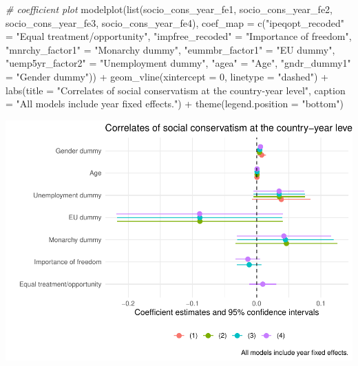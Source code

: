 \documentclass[
]{article}
\newenvironment{Shaded}{\begin{snugshade}}{\end{snugshade}}
\newcommand{\AttributeTok}[1]{\textcolor[rgb]{0.77,0.63,0.00}{#1}}
\newcommand{\CommentTok}[1]{\textcolor[rgb]{0.56,0.35,0.01}{\textit{#1}}}
\newcommand{\DecValTok}[1]{\textcolor[rgb]{0.00,0.00,0.81}{#1}}
\newcommand{\FunctionTok}[1]{\textcolor[rgb]{0.00,0.00,0.00}{#1}}
\newcommand{\NormalTok}[1]{#1}
\newcommand{\OtherTok}[1]{\textcolor[rgb]{0.56,0.35,0.01}{#1}}
\newcommand{\SpecialCharTok}[1]{\textcolor[rgb]{0.00,0.00,0.00}{#1}}
\newcommand{\StringTok}[1]{\textcolor[rgb]{0.31,0.60,0.02}{#1}}
\begin{document}
\begin{Shaded}
\begin{Highlighting}[]
\CommentTok{\# coefficient plot }
\FunctionTok{modelplot}\NormalTok{(}\FunctionTok{list}\NormalTok{(socio\_cons\_year\_fe1, socio\_cons\_year\_fe2, }
\NormalTok{                socio\_cons\_year\_fe3, socio\_cons\_year\_fe4),}
          \AttributeTok{coef\_map =} \FunctionTok{c}\NormalTok{(}\StringTok{"ipeqopt\_recoded"} \OtherTok{=} \StringTok{"Equal treatment/opportunity"}\NormalTok{, }
                       \StringTok{"impfree\_recoded"} \OtherTok{=} \StringTok{"Importance of freedom"}\NormalTok{, }
                       \StringTok{"mnrchy\_factor1"} \OtherTok{=} \StringTok{"Monarchy dummy"}\NormalTok{, }
                       \StringTok{"eummbr\_factor1"} \OtherTok{=} \StringTok{"EU dummy"}\NormalTok{, }
                       \StringTok{"uemp5yr\_factor2"} \OtherTok{=} \StringTok{"Unemployment dummy"}\NormalTok{, }
                       \StringTok{"agea"} \OtherTok{=} \StringTok{"Age"}\NormalTok{, }
                       \StringTok{"gndr\_dummy1"} \OtherTok{=} \StringTok{"Gender dummy"}\NormalTok{)) }\SpecialCharTok{+}
  \FunctionTok{geom\_vline}\NormalTok{(}\AttributeTok{xintercept =} \DecValTok{0}\NormalTok{, }\AttributeTok{linetype =} \StringTok{"dashed"}\NormalTok{) }\SpecialCharTok{+}
  \FunctionTok{labs}\NormalTok{(}\AttributeTok{title =} \StringTok{"Correlates of social conservatism at the country{-}year level"}\NormalTok{, }
       \AttributeTok{caption =} \StringTok{"All models include year fixed effects."}\NormalTok{) }\SpecialCharTok{+}
  \FunctionTok{theme}\NormalTok{(}\AttributeTok{legend.position =} \StringTok{"bottom"}\NormalTok{)}
\end{Highlighting}
\end{Shaded}

\includegraphics{AVCD-Assignment3-Edenhofer_files/figure-latex/socio-cons-year-fe-1.pdf}
\end{document}
